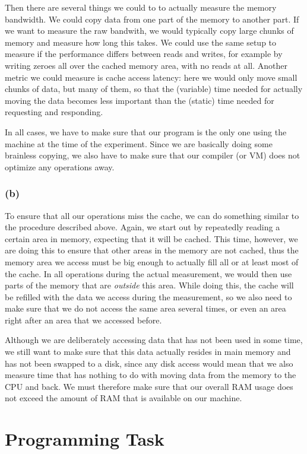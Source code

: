 \documentclass[12pt,a4paper]{article}
\begin{document}
Then there are several things we could to to actually measure the memory bandwidth. We could copy data from one part of the memory to another part. If we want to measure the raw bandwith, we would typically copy large chunks of memory and measure how long this takes. We could use the same setup to measure if the performance differs between reads and writes, for example by writing zeroes all over the cached memory area, with no reads at all. Another metric we could measure is cache access latency: here we would only move small chunks of data, but many of them, so that the (variable) time needed for actually moving the data becomes less important than the (static) time needed for requesting and responding.

In all cases, we have to make sure that our program is the only one using the machine at the time of the experiment. Since we are basically doing some brainless copying, we also have to make sure that our compiler (or VM) does not optimize any operations away.

\subsubsection*{(b)}
To ensure that all our operations miss the cache, we can do something similar to the procedure described above. Again, we start out by repeatedly reading a certain area in memory, expecting that it will be cached. This time, however, we are doing this to ensure that other areas in the memory are not cached, thus the memory area we access must be big enough to actually fill all or at least most of the cache. In all operations during the actual measurement, we would then use parts of the memory that are \emph{outside} this area. While doing this, the cache will be refilled with the data we access during the measurement, so we also need to make sure that we do not access the same area several times, or even an area right after an area that we accessed before.

Although we are deliberately accessing data that has not been used in some time, we still want to make sure that this data actually resides in main memory and has not been swapped to a disk, since any disk access would mean that we also measure time that has nothing to do with moving data from the memory to the CPU and back. We must therefore make sure that our overall RAM usage does not exceed the amount of RAM that is available on our machine.

\section*{Programming Task}
\label{sec:programming}
\end{document}
